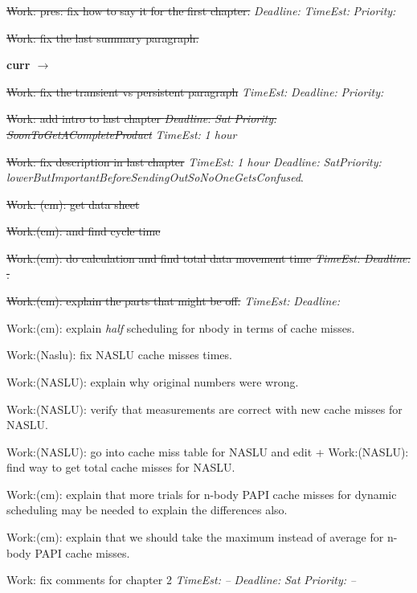 \documentclass[12pt] {article}
\newcommand{\doneTask}[1]{\sout{#1}}
\newcommand{\dl}[1]{\textit{Deadline:} \textit{#1}}
\newcommand{\te}[1]{\textit{TimeEst:} \textit{#1}}
\newcommand{\pr}[1]{\textit{Priority:} \textit{#1}}
\begin{document}
\begin{enumerate}
{\item \doneTask{Work: pres: fix how to say it for the first chapter.}
  \dl{} \te{} \pr{}

\item \doneTask{Work: fix the last summary paragraph.} 
\item \textbf{curr $\rightarrow$} \\
\item \doneTask{Work: fix the transient vs persistent paragraph} \te{}
  \dl{} \pr{}
\item \doneTask{Work: add intro to last chapter \dl{Sat}
  \pr{SoonToGetACompleteProduct}} \te{1 hour}
\item \doneTask{Work: fix description in last chapter} \te{1 hour}
  \dl{Sat}\pr{lowerButImportantBeforeSendingOutSoNoOneGetsConfused}.

\item \doneTask{Work: (cm): get data sheet}
\item \doneTask{Work:(cm): and find cycle time}
\item \doneTask{Work:(cm): do calculation and find total data movement time \te{} \dl{}.}

\item \doneTask{Work:(cm): explain the parts that might be off.} \te{}\dl{}

\item Work:(cm): explain \textit{half} scheduling for nbody in terms of cache misses. 

\item Work:(Naslu): fix NASLU cache misses times.
\item Work:(NASLU): explain why original numbers were wrong.
\item Work:(NASLU): verify that measurements are correct with new cache
misses for NASLU. 
\item Work:(NASLU): go into cache miss table for NASLU and edit + Work:(NASLU): find way to get total cache misses for NASLU. 

\item Work:(cm): explain that more trials for n-body PAPI cache misses
 for dynamic scheduling may be needed to explain the differences also.

\item Work:(cm): explain that we should take the maximum instead of average
for n-body PAPI cache misses. 

\item Work: fix comments for chapter 2 \te{--} \dl{Sat} \pr{--} 

}
\end{enumerate}
\end{document}
